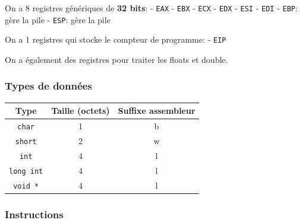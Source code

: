 On a 8 registres génériques de \textbf{32 bits}: - \texttt{EAX} -
\texttt{EBX} - \texttt{ECX} - \texttt{EDX} - \texttt{ESI} - \texttt{EDI}
- \texttt{EBP}: gère la pile - \texttt{ESP}: gère la pile

On a 1 registres qui stocke le compteur de programme: - \texttt{EIP}

On a également des registres pour traiter les floats et double.

\subsubsection{Types de données}\label{types-de-donnuxe9es}

\begin{longtable}[]{@{}ccc@{}}
\toprule\noalign{}
Type & Taille (octets) & Suffixe assembleur \\
\midrule\noalign{}
\endhead
\bottomrule\noalign{}
\endlastfoot
\texttt{char} & 1 & b \\
\texttt{short} & 2 & w \\
\texttt{int} & 4 & l \\
\texttt{long\ int} & 4 & l \\
\texttt{void\ *} & 4 & l \\
\end{longtable}

\subsubsection{Instructions}\label{instructions}

